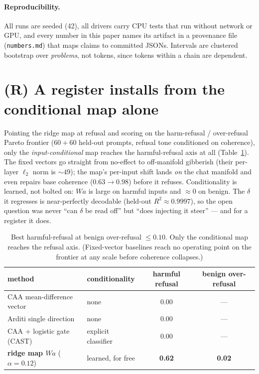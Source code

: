 \documentclass{article}
\begin{document}
\paragraph{Reproducibility.} All runs are seeded (42), all drivers carry CPU tests that run without
network or GPU, and every number in this paper names its artifact in a provenance file
(\texttt{numbers.md}) that maps claims to committed JSONs. Intervals are clustered bootstrap over
\emph{problems}, not tokens, since tokens within a chain are dependent.

\section{(R) A register installs from the conditional map alone}
\label{sec:refusal}

Pointing the ridge map at refusal and scoring on the harm-refusal / over-refusal Pareto frontier
($60{+}60$ held-out prompts, refusal tone conditioned on coherence), only the
\emph{input-conditional} map reaches the harmful-refusal axis at all
(Table~\ref{tab:refusal}). The fixed vectors go straight from no-effect to off-manifold gibberish
(their per-layer $\ell_2$ norm is ${\sim}49$); the map's per-input shift lands \emph{on} the chat
manifold and even repairs base coherence ($0.63 \to 0.98$) before it refuses. Conditionality is
learned, not bolted on: $Wa$ is large on harmful inputs and ${\approx}0$ on benign. The $\delta$ it
regresses is near-perfectly decodable (held-out $R^2 \approx 0.9997$), so the open question was
never ``can $\delta$ be read off'' but ``does injecting it steer'' --- and for a register it does.

\begin{table}[t]
\centering
\caption{Best harmful-refusal at benign over-refusal $\leq 0.10$. Only the conditional map reaches
the refusal axis. (Fixed-vector baselines reach no operating point on the frontier at any scale
before coherence collapses.)}
\label{tab:refusal}
\small
\begin{tabular}{llcc}
\toprule
method & conditionality & harmful refusal & benign over-refusal \\
\midrule
CAA mean-difference vector & none & 0.00 & --- \\
Arditi single direction & none & 0.00 & --- \\
CAA + logistic gate (CAST) & explicit classifier & 0.00 & --- \\
\textbf{ridge map $Wa$} ($\alpha{=}0.12$) & learned, for free & \textbf{0.62} & \textbf{0.02} \\
\bottomrule
\end{tabular}
\end{table}
\end{document}
